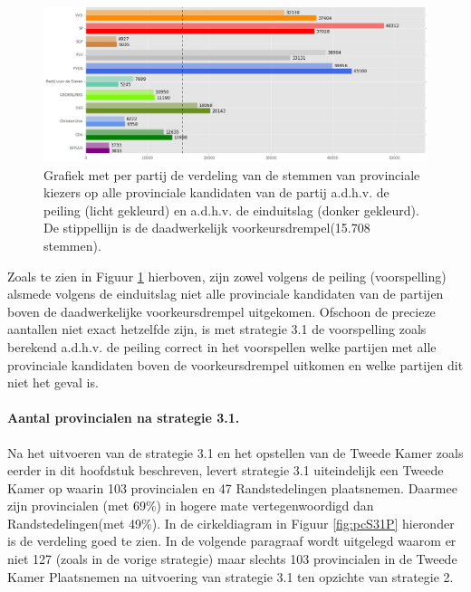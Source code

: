 \begin{figure}[H]

	\includegraphics[width=\linewidth]	{stemmen_op_provincialen_top15_of_topN_samen.png}

			\caption{Grafiek met per partij de verdeling van de stemmen van provinciale kiezers op alle provinciale kandidaten van de partij a.d.h.v. de peiling (licht gekleurd) en a.d.h.v. de einduitslag (donker gekleurd). De stippellijn is de daadwerkelijk voorkeursdrempel(15.708 stemmen).}

\label{fig:stemmenS31P}
\end{figure}

Zoals te zien in Figuur \ref{fig:stemmenS31P} hierboven, zijn zowel volgens de peiling (voorspelling) alsmede volgens de einduitslag niet alle provinciale kandidaten van de partijen boven de daadwerkelijke voorkeursdrempel uitgekomen. Ofschoon de precieze aantallen niet exact hetzelfde zijn, is met strategie 3.1 de voorspelling zoals berekend a.d.h.v. de peiling correct in het voorspellen welke partijen met alle provinciale kandidaten boven de voorkeursdrempel uitkomen en welke partijen dit niet het geval is. 

\paragraph{Aantal provincialen na strategie 3.1.}
Na het uitvoeren van de strategie 3.1 en het opstellen van de Tweede Kamer zoals eerder in dit hoofdstuk beschreven, levert strategie 3.1 uiteindelijk een Tweede Kamer op waarin 103 provincialen en 47 Randstedelingen plaatsnemen. Daarmee zijn provincialen (met 69\%) in hogere mate vertegenwoordigd dan Randstedelingen(met 49\%). In de cirkeldiagram in Figuur \ref{fig:pcS31P} hieronder is de verdeling goed te zien. In de volgende paragraaf wordt uitgelegd waarom er niet 127 (zoals in de vorige strategie) maar slechts 103 provincialen in de Tweede Kamer Plaatsnemen na uitvoering van strategie 3.1 ten opzichte van strategie 2.

